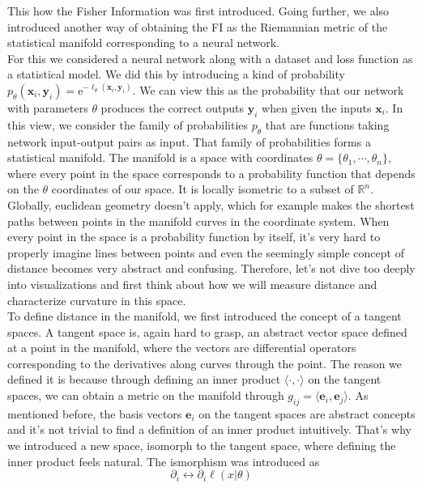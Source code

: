 This how the Fisher Information was first introduced. Going further, we also introduced another way of obtaining the FI as the Riemannian metric of the statistical manifold corresponding to a neural network.\\
For this we considered a neural network along with a dataset and loss function as a statistical model. We did this by introducing a kind of probability $p_\theta(\mathbf{x}_i,\mathbf{y}_i) = \mathrm{e}^{-\ell_\theta(\mathbf{x}_i,\mathbf{y}_i)}$. We can view this as the probability that our network with parameters $\theta$ produces the correct outputs $\mathbf{y}_i$ when given the inputs $\mathbf{x}_i$. In this view, we consider the family of probabilities $p_\theta$ that are functions taking network input-output pairs as input. That family of probabilities forms a statistical manifold. The manifold is a space with coordinates $\theta = \{\theta_1, \cdots, \theta_n\}$, where every point in the space corresponds to a probability function that depends on the $\theta$ coordinates of our space. It is locally isometric to a subset of $\mathbb{R}^n$. Globally, euclidean geometry doesn't apply, which for example makes the shortest paths between points in the manifold curves in the coordinate system. When every point in the space is a probability function by itself, it's very hard to properly imagine lines between points and even the seemingly simple concept of distance becomes very abstract and confusing. Therefore, let's not dive too deeply into visualizations and first think about how we will measure distance and characterize curvature in this space. \\
To define distance in the manifold, we first introduced the concept of a tangent spaces. A tangent space is, again hard to grasp, an abstract vector space defined at a point in the manifold, where the vectors are differential operators corresponding to the derivatives along curves through the point. The reason we defined it is because through defining an inner product $\langle \cdot , \cdot \rangle$ on the tangent spaces, we can obtain a metric on the manifold through $g_{ij} = \langle \mathbf{e}_i,\mathbf{e}_j\rangle$. As mentioned before, the basis vectors $\mathbf{e}_i$ on the tangent spaces are abstract concepts and it's not trivial to find a definition of an inner product intuitively. That's why we introduced a new space, isomorph to the tangent space, where defining the inner product feels natural. The ismorphism was introduced as
\begin{equation}
	\partial_i \leftrightarrow \partial_i \ell(x|\theta)
\end{equation}
